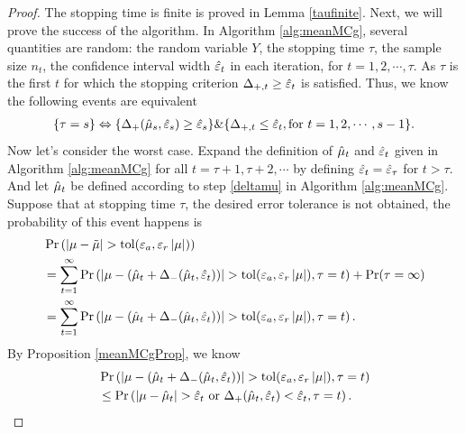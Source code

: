 \documentclass{iitthesis}
\theoremstyle{definition}
\begin{document}
\begin{proof}
The stopping time is finite is proved in Lemma \ref{taufinite}. Next, we will prove the success of the algorithm.
In Algorithm \ref{alg:meanMCg}, several quantities are random: the random variable $Y$, the stopping time $\tau$, the sample size $n_t$,  the confidence interval width $\hat{\varepsilon}_t$ in each iteration, for $t = 1,2,\cdots, \tau$. 
As $\tau$ is the first $t$ for which the stopping criterion $\Delta_{+, t} \geq \hat{\varepsilon}_t$ is satisfied. Thus, we know the following events are equivalent
\begin{align}\label{STrelationshop}
\{\tau = s\} \Leftrightarrow \{\Delta_{+}(\hat{\mu}_s,\hat{\varepsilon}_s)\geq \hat{\varepsilon}_s\} \& \{\Delta_{+,t} \leq \hat{\varepsilon}_t, \text{for }  t = 1,2,\cdots, s-1 \}.
\end{align}
Now let's consider the worst case. Expand the definition of $\hat{\mu}_t$ and $\hat{\varepsilon}_t$ given in Algorithm \ref{alg:meanMCg} for all $t = \tau+1, \tau+2, \cdots$ by defining $\hat{\varepsilon}_t = \hat{\varepsilon}_\tau$ for $t >\tau$. And let $\hat{\mu}_t$ be defined according to step \ref{deltamu} in Algorithm \ref{alg:meanMCg}. Suppose that at stopping time $\tau$, the desired error tolerance is not obtained, the probability of this event happens is
\begin{align}\label{439}
&\Pr \left( \left \lvert \mu-\tilde{\mu} \right \rvert> \operatorname{tol}(\varepsilon_a,\varepsilon_r\left \lvert \mu \right \rvert)\right) \nonumber\\
&=\sum_{t=1}^\infty\Pr \left( \left \lvert \mu-(\hat{\mu}_t+\Delta_{-}(\hat{\mu}_t,\hat{\varepsilon}_t)) \right \rvert> \operatorname{tol}(\varepsilon_a,\varepsilon_r\left \lvert \mu \right \rvert), \tau = t \right)+\Pr(\tau = \infty)\nonumber\\
&=\sum_{t=1}^\infty\Pr \left( \left \lvert \mu-(\hat{\mu}_t+\Delta_{-}(\hat{\mu}_t,\hat{\varepsilon}_t)) \right \rvert> \operatorname{tol}(\varepsilon_a,\varepsilon_r\left \lvert \mu \right \rvert), \tau = t \right).
\end{align}
By Proposition \ref{meanMCgProp}, we know
\begin{align*}
 &\Pr \left( \left \lvert \mu-(\hat{\mu}_t+\Delta_{-}(\hat{\mu}_t,\hat{\varepsilon}_t)) \right \rvert> \operatorname{tol}(\varepsilon_a,\varepsilon_r\left \lvert \mu \right \rvert), \tau = t  \right)\\
&\leq
\Pr \left( \left \lvert \mu-\hat{\mu}_t \right \rvert>\hat{\varepsilon}_t  \text{ or } \Delta_{+}(\hat{\mu}_t,\hat{\varepsilon}_t)<\hat{\varepsilon}_t , \tau = t \right).
\end{align*}

\end{proof}
\end{document}
